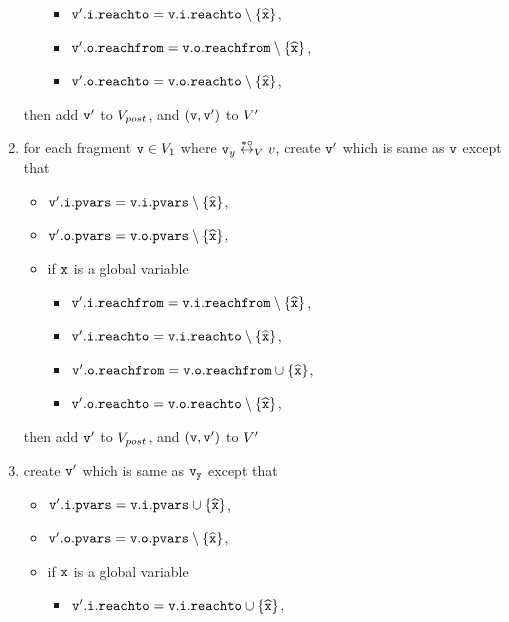 \begin{enumerate}
\begin{itemize}
\begin{itemize}
\item $\mathtt{v}'.\mathtt{i}.\mathtt{reachto} = \mathtt{v}.\mathtt{i}.\mathtt{reachto} \setminus \left\{\widehat{\mathtt{x}}\right\}$,
\item $\mathtt{v}'.\mathtt{o}.\mathtt{reachfrom} = \mathtt{v}.\mathtt{o}.\mathtt{reachfrom} \setminus \left\{\widehat{\mathtt{x}}\right\}$,
\item $\mathtt{v}'.\mathtt{o}.\mathtt{reachto} = \mathtt{v}.\mathtt{o}.\mathtt{reachto} \setminus \left\{\widehat{\mathtt{x}}\right\}$,
\end{itemize}
\end{itemize}
then add $\mathtt{v}'$ to $V_{post}$, and $(\mathtt{v},\mathtt{v}')$ to $V'$
\item for each fragment $\mathtt{v} \in V_1$ where $\mathtt{v}_y \overset{*\circ}\leftrightarrow_{V} v$, create $\mathtt{v}'$ which is same as $\mathtt{v}$ except that
\begin{itemize}
\item $\mathtt{v}'.\mathtt{i}.\mathtt{pvars} = \mathtt{v}.\mathtt{i}.\mathtt{pvars} \setminus \left\{\widehat{\mathtt{x}}\right\}$,
\item $\mathtt{v}'.\mathtt{o}.\mathtt{pvars} = \mathtt{v}.\mathtt{o}.\mathtt{pvars} \setminus \left\{\widehat{\mathtt{x}}\right\}$,
\item if $\mathtt{x}$ is a global variable
\begin{itemize}
\item $\mathtt{v}'.\mathtt{i}.\mathtt{reachfrom} = \mathtt{v}.\mathtt{i}.\mathtt{reachfrom} \setminus \left\{\widehat{\mathtt{x}}\right\}$,
\item $\mathtt{v}'.\mathtt{i}.\mathtt{reachto} = \mathtt{v}.\mathtt{i}.\mathtt{reachto} \setminus \left\{\widehat{\mathtt{x}}\right\}$,
\item $\mathtt{v}'.\mathtt{o}.\mathtt{reachfrom} = \mathtt{v}.\mathtt{o}.\mathtt{reachfrom} \cup \left\{\widehat{\mathtt{x}}\right\}$,
\item $\mathtt{v}'.\mathtt{o}.\mathtt{reachto} = \mathtt{v}.\mathtt{o}.\mathtt{reachto} \setminus \left\{\widehat{\mathtt{x}}\right\}$,
\end{itemize}
\end{itemize}
then add $\mathtt{v}'$ to $V_{post}$, and $(\mathtt{v},\mathtt{v}')$ to $V'$
\item create $\mathtt{v}'$ which is same as $\tt \mathtt{v}_y$ except that
\begin{itemize}
\item $\mathtt{v}'.\mathtt{i}.\mathtt{pvars} = \mathtt{v}.\mathtt{i}.\mathtt{pvars} \cup \left\{\widehat{\mathtt{x}}\right\}$,
\item $\mathtt{v}'.\mathtt{o}.\mathtt{pvars} = \mathtt{v}.\mathtt{o}.\mathtt{pvars} \setminus \left\{\widehat{\mathtt{x}}\right\}$,
\item if $\mathtt{x}$ is a global variable
\begin{itemize}
\item $\mathtt{v}'.\mathtt{i}.\mathtt{reachto} = \mathtt{v}.\mathtt{i}.\mathtt{reachto} \cup \left\{\widehat{\mathtt{x}}\right\}$,

\end{itemize}
\end{itemize}
\end{enumerate}
